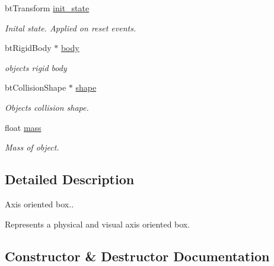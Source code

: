 \begin{DoxyCompactItemize}
bt\+Transform \hyperlink{classbtosgObject_a2dee023f311114e200df9b04c8c1b400}{init\+\_\+state}
\begin{DoxyCompactList}\small\item\em Inital state. Applied on reset events. \end{DoxyCompactList}\item 
\mbox{\label{classbtosgObject_a64ccde0543c184ed1749fdb9c9699785}} 
bt\+Rigid\+Body $\ast$ \hyperlink{classbtosgObject_a64ccde0543c184ed1749fdb9c9699785}{body}
\begin{DoxyCompactList}\small\item\em object\textquotesingle{}s rigid body \end{DoxyCompactList}\item 
\mbox{\label{classbtosgObject_a0f6a8da01cf643c321bffe86e42604b0}} 
bt\+Collision\+Shape $\ast$ \hyperlink{classbtosgObject_a0f6a8da01cf643c321bffe86e42604b0}{shape}
\begin{DoxyCompactList}\small\item\em Object\textquotesingle{}s collision shape. \end{DoxyCompactList}\item 
\mbox{\label{classbtosgObject_a2418bb2194d5e9b0f1c51c84672ba7d1}} 
float \hyperlink{classbtosgObject_a2418bb2194d5e9b0f1c51c84672ba7d1}{mass}
\begin{DoxyCompactList}\small\item\em Mass of object. \end{DoxyCompactList}\end{DoxyCompactItemize}


\subsection{Detailed Description}
Axis oriented box.. 

Represents a physical and visual axis oriented box. 

\subsection{Constructor \& Destructor Documentation}
\mbox{\label{classbtosgBox_aaffbdeeac3ee040dea98c19b538f0e49}} 

